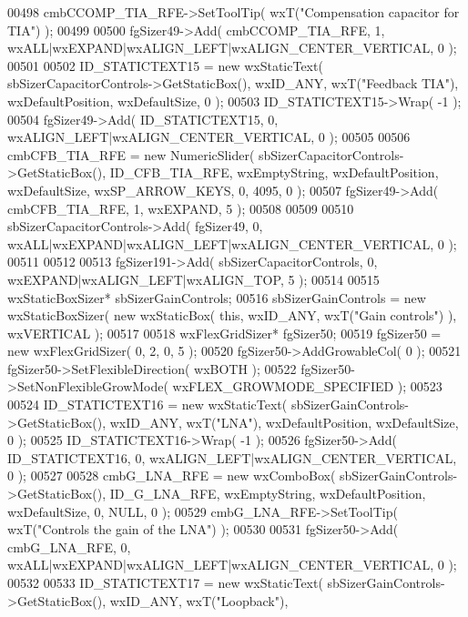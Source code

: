 \begin{DoxyCode}
00498     cmbCCOMP_TIA_RFE->SetToolTip( wxT(\textcolor{stringliteral}{"Compensation capacitor for TIA"}) );
00499     
00500     fgSizer49->Add( cmbCCOMP_TIA_RFE, 1, wxALL|wxEXPAND|wxALIGN\_LEFT|wxALIGN\_CENTER\_VERTICAL, 0 );
00501     
00502     ID_STATICTEXT15 = \textcolor{keyword}{new} wxStaticText( sbSizerCapacitorControls->GetStaticBox(), wxID\_ANY, wxT(\textcolor{stringliteral}{"Feedback
       TIA"}), wxDefaultPosition, wxDefaultSize, 0 );
00503     ID_STATICTEXT15->Wrap( -1 );
00504     fgSizer49->Add( ID_STATICTEXT15, 0, wxALIGN\_LEFT|wxALIGN\_CENTER\_VERTICAL, 0 );
00505     
00506     cmbCFB_TIA_RFE = \textcolor{keyword}{new} NumericSlider( sbSizerCapacitorControls->GetStaticBox(), 
      ID_CFB_TIA_RFE, wxEmptyString, wxDefaultPosition, wxDefaultSize, wxSP\_ARROW\_KEYS, 0, 4095, 0 );
00507     fgSizer49->Add( cmbCFB_TIA_RFE, 1, wxEXPAND, 5 );
00508     
00509     
00510     sbSizerCapacitorControls->Add( fgSizer49, 0, wxALL|wxEXPAND|wxALIGN\_LEFT|wxALIGN\_CENTER\_VERTICAL, 0 );
00511     
00512     
00513     fgSizer191->Add( sbSizerCapacitorControls, 0, wxEXPAND|wxALIGN\_LEFT|wxALIGN\_TOP, 5 );
00514     
00515     wxStaticBoxSizer* sbSizerGainControls;
00516     sbSizerGainControls = \textcolor{keyword}{new} wxStaticBoxSizer( \textcolor{keyword}{new} wxStaticBox( \textcolor{keyword}{this}, wxID\_ANY, wxT(\textcolor{stringliteral}{"Gain controls"}) ), 
      wxVERTICAL );
00517     
00518     wxFlexGridSizer* fgSizer50;
00519     fgSizer50 = \textcolor{keyword}{new} wxFlexGridSizer( 0, 2, 0, 5 );
00520     fgSizer50->AddGrowableCol( 0 );
00521     fgSizer50->SetFlexibleDirection( wxBOTH );
00522     fgSizer50->SetNonFlexibleGrowMode( wxFLEX\_GROWMODE\_SPECIFIED );
00523     
00524     ID_STATICTEXT16 = \textcolor{keyword}{new} wxStaticText( sbSizerGainControls->GetStaticBox(), wxID\_ANY, wxT(\textcolor{stringliteral}{"LNA"}), 
      wxDefaultPosition, wxDefaultSize, 0 );
00525     ID_STATICTEXT16->Wrap( -1 );
00526     fgSizer50->Add( ID_STATICTEXT16, 0, wxALIGN\_LEFT|wxALIGN\_CENTER\_VERTICAL, 0 );
00527     
00528     cmbG_LNA_RFE = \textcolor{keyword}{new} wxComboBox( sbSizerGainControls->GetStaticBox(), 
      ID_G_LNA_RFE, wxEmptyString, wxDefaultPosition, wxDefaultSize, 0, NULL, 0 ); 
00529     cmbG_LNA_RFE->SetToolTip( wxT(\textcolor{stringliteral}{"Controls the gain of the LNA"}) );
00530     
00531     fgSizer50->Add( cmbG_LNA_RFE, 0, wxALL|wxEXPAND|wxALIGN\_LEFT|wxALIGN\_CENTER\_VERTICAL, 0 );
00532     
00533     ID_STATICTEXT17 = \textcolor{keyword}{new} wxStaticText( sbSizerGainControls->GetStaticBox(), wxID\_ANY, wxT(\textcolor{stringliteral}{"Loopback"}), 

\end{DoxyCode}
